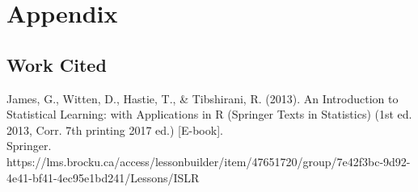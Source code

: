 \documentclass{article}
\begin{document}
\newpage

\section{Appendix}

\subsection{Work Cited}
James, G., Witten, D., Hastie, T., & Tibshirani, R. (2013). An Introduction to Statistical Learning: with Applications in R (Springer Texts in Statistics) (1st ed. 2013, Corr. 7th printing 2017 ed.) [E-book].\\
Springer. https://lms.brocku.ca/access/lessonbuilder/item/47651720/group/7e42f3bc-9d92-4e41-bf41-4ec95e1bd241/Lessons/ISLR%
\end{document}
